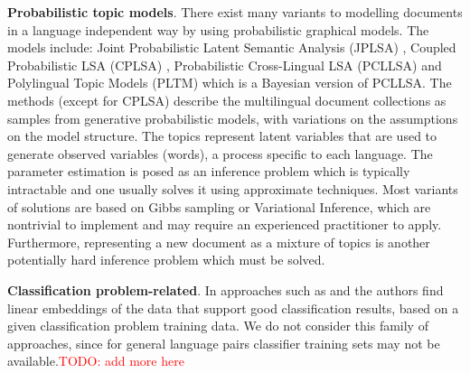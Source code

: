 \documentclass[twoside,11pt]{article}
\newcommand{\todo}[1]{\textcolor{red}{TODO: #1}}
\begin{document}
\textbf{Probabilistic topic models}. There exist many variants to modelling documents in a language independent way by using probabilistic graphical models. The models include:  Joint Probabilistic Latent Semantic Analysis (JPLSA) , Coupled Probabilistic LSA (CPLSA) \cite{platt2010translingual}, Probabilistic Cross-Lingual LSA (PCLLSA)\cite{PCL_LSA} and Polylingual Topic Models (PLTM)  which is a Bayesian version of PCLLSA. The methods (except for CPLSA) describe the multilingual document collections as samples from generative probabilistic models, with variations on the assumptions on the model structure. The topics represent latent variables that are used to generate observed variables (words), a process specific to each language. The parameter estimation is posed as an inference problem which is typically intractable and one usually solves it using approximate techniques. Most variants of solutions are based on Gibbs sampling or Variational Inference, which are nontrivial to implement and may require an experienced practitioner to apply. Furthermore, representing a new document as a mixture of topics is another potentially hard inference problem which must be solved.

\textbf{Classification problem-related}. In approaches such as \cite{cotrain} and  the authors find linear embeddings of the data that support good classification results, based on a given classification problem training data. We do not consider this family of approaches, since for general language pairs classifier training sets may not be available.\todo{add more here}
\end{document}
